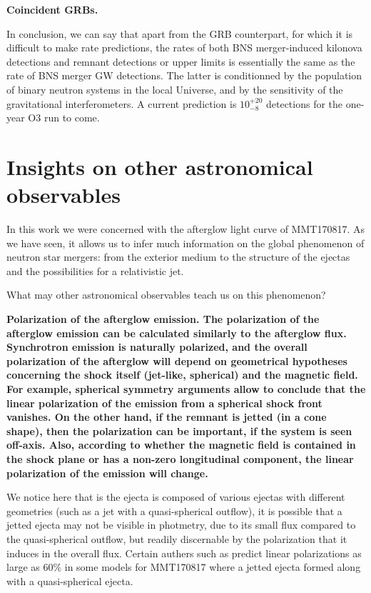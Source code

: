 \bf{Coincident GRBs. }



In conclusion, we can say that apart from the GRB counterpart, for which it is difficult to make rate predictions, the rates of both BNS merger-induced kilonova detections and remnant detections or upper limits is essentially the same as the rate of BNS merger GW detections. The latter is conditionned by the population of binary neutron systems in the local Universe, and by the sensitivity of the gravitational interferometers. A current prediction is $10^{+20}_{-8}$ detections for the one-year O3 run to come.

\section{Insights on other astronomical observables}

In this work we were concerned with the afterglow light curve of MMT170817. As we have seen, it allows us to infer much information on the global phenomenon of neutron star mergers: from the exterior medium to the structure of the ejectas and the possibilities for a relativistic jet. 

What may other astronomical observables teach us on this phenomenon?



\bf{Polarization of the afterglow emission.} The polarization of the afterglow emission can be calculated similarly to the afterglow flux. Synchrotron emission is naturally polarized, and the overall polarization of the afterglow will depend on geometrical hypotheses concerning the shock itself (jet-like, spherical) and the magnetic field. For example, spherical symmetry arguments allow to conclude that the linear polarization of the emission from  a spherical shock front vanishes. On the other hand, if the remnant is jetted (in a cone shape), then the polarization can be important, if the system is seen off-axis. Also, according to whether the magnetic field is contained in the shock plane or has a non-zero longitudinal component, the linear polarization of the emission will change.

We notice here that is the ejecta is composed of various ejectas with different geometries (such as a jet with a quasi-spherical outflow), it is possible that a jetted ejecta may not be visible in photmetry, due to its small flux compared to the quasi-spherical outflow, but readily discernable by the polarization that it induces in the overall flux. Certain authers such as \cite{7} predict linear polarizations as large as 60\% in some models for MMT170817 where a jetted ejecta formed along with a quasi-spherical ejecta.

